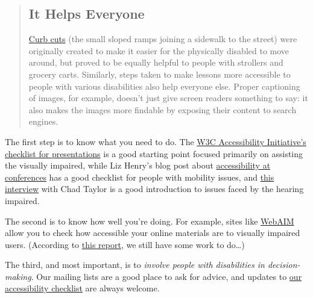 \begin{quotation}   %
\subsection*{It Helps Everyone}

\href{https://en.wikipedia.org/wiki/Curb\_cut}{Curb cuts}
(the small sloped ramps joining a sidewalk to the street)
were originally created to make it easier for the physically disabled to move around,
but proved to be equally helpful to people with strollers and grocery carts.
Similarly,
steps taken to make lessons more accessible to people with various disabilities
also help everyone else.
Proper captioning of images,
for example,
doesn't just give screen readers something to say:
it also makes the images more findable
by exposing their content to search engines.
\end{quotation}   %

The first step is to know what you need to do.
The \href{http://www.w3.org/WAI/training/accessible}{W3C Accessibility Initiative's checklist for presentations}
is a good starting point focused primarily on assisting the visually impaired,
while Liz Henry's blog post about
\href{https://modelviewculture.com/pieces/unlocking-the-invisible-elevator-accessibility-at-tech-conferences}{accessibility at conferences}
has a good checklist for people with mobility issues,
and \href{https://modelviewculture.com/pieces/qa-making-tech-events-accessible-to-the-deaf-community}{this interview}
with Chad Taylor is a good introduction to issues faced by the hearing impaired.

The second is to know how well you're doing.
For example,
sites like \href{http://webaim.org/}{WebAIM} allow you to check
how accessible your online materials are to visually impaired users.
(According to \href{http://wave.webaim.org/report\#/software-carpentry.org}{this report},
we still have some work to do\ldots{})

The third,
and most important,
is to \emph{involve people with disabilities in decision-making}.
Our mailing lists are a good place to ask for advice,
and updates to \href{\{\{ site.swc\_site \}\}/workshops/checklists/accessibility/}{our accessibility checklist}
are always welcome.

